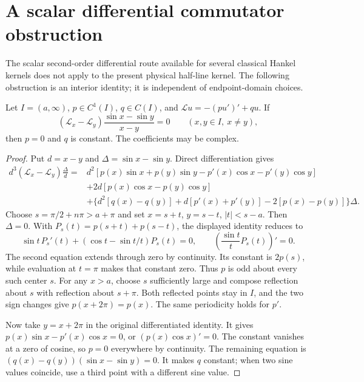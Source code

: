 \section{A scalar differential commutator obstruction}
\label{boundary:app:commutator}

The scalar second-order differential route available for several
classical Hankel kernels does not apply to the present physical
half-line kernel.  The following obstruction is an interior identity;
it is independent of endpoint-domain choices.

\begin{proposition}
\label{boundary:prop:no-second-order}
Let $I=(a,\infty)$, $p\in C^1(I)$, $q\in C(I)$, and
$\mathcal L u=-(pu')'+qu$.  If
\[
 (\mathcal L_x-\mathcal L_y)
 \frac{\sin x-\sin y}{x-y}=0
 \qquad(x,y\in I,\ x\ne y),
\]
then $p=0$ and $q$ is constant.  The coefficients may be complex.
\end{proposition}
\begin{proof}
Put $d=x-y$ and $\Delta=\sin x-\sin y$.  Direct differentiation gives
\begin{align*}
 d^3(\mathcal L_x-\mathcal L_y)\frac{\Delta}{d}
 ={}&d^2[p(x)\sin x+p(y)\sin y-p'(x)\cos x-p'(y)\cos y]\\
 &+2d[p(x)\cos x-p(y)\cos y]\\
 &+\{d^2[q(x)-q(y)]+d[p'(x)+p'(y)]-2[p(x)-p(y)]\}\Delta.
\end{align*}
Choose $s=\pi/2+n\pi>a+\pi$ and set $x=s+t$, $y=s-t$,
$|t|<s-a$.  Then $\Delta=0$.  With
$P_s(t)=p(s+t)+p(s-t)$, the displayed identity reduces to
\[
 \sin t\,P_s'(t)+(\cos t-\sin t/t)P_s(t)=0,
 \qquad
 \left(\frac{\sin t}{t}P_s(t)\right)'=0.
\]
The second equation extends through zero by continuity.  Its constant
is $2p(s)$, while evaluation at $t=\pi$ makes that constant zero.
Thus $p$ is odd about every such center $s$.
For any $x>a$, choose $s$ sufficiently large and compose reflection
about $s$ with reflection about $s+\pi$.  Both reflected points stay
in $I$, and the two sign changes give $p(x+2\pi)=p(x)$.
The same periodicity holds for $p'$.

Now take $y=x+2\pi$ in the original differentiated identity.
It gives $p(x)\sin x-p'(x)\cos x=0$, or $(p(x)\cos x)'=0$.
The constant vanishes at a zero of cosine, so $p=0$ everywhere by
continuity.  The remaining equation is
$(q(x)-q(y))(\sin x-\sin y)=0$.  It makes $q$ constant; when two
sine values coincide, use a third point with a different sine value.
\end{proof}

